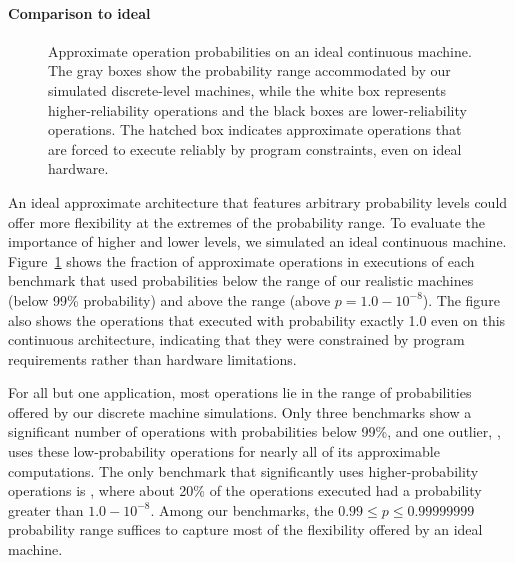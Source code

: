 \paragraph{Comparison to ideal}

\begin{figure}
    \hspace{-3ex}
    
    \caption{Approximate operation probabilities on an ideal continuous
    machine. The gray boxes show the probability range accommodated by
    our simulated discrete-level machines, while the white box represents
    higher-reliability operations and the black boxes are
    lower-reliability operations.
    The hatched box indicates approximate operations that are forced to
    execute reliably by program constraints, even on ideal hardware.}
    \label{decaf:fig:idealhist}
\end{figure}

An ideal approximate architecture that features arbitrary probability levels
could offer more flexibility at the extremes of the probability range.
To evaluate the importance of higher and lower levels, we
simulated an ideal continuous machine.
Figure~\ref{decaf:fig:idealhist} shows the fraction of approximate operations in
executions of each benchmark that used probabilities below the range of our
realistic machines (below 99\% probability) and above the range (above $p =
1.0 - 10^{-8}$).
The figure also shows the operations that executed with probability exactly
1.0 even on this continuous architecture, indicating that they were
constrained by program requirements rather than hardware limitations.

For all but one application, most operations lie in the range of probabilities
offered by our discrete machine simulations.
Only three benchmarks show a significant number of operations with
probabilities below 99\%, and one outlier, , uses these
low-probability operations for nearly all of its approximable computations.
The only benchmark that significantly uses higher-probability operations
is , where about 20\% of the operations executed had a probability
greater than $1.0 - 10^{-8}$.
Among our benchmarks, the $0.99 \le p \le 0.99999999$ probability range
suffices to capture most of the flexibility offered by an ideal machine.


